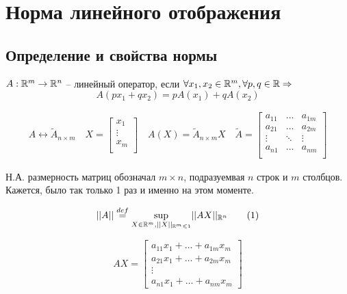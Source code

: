 \documentclass[main]{subfiles}
\begin{document}
\chapter{Норма линейного отображения}
\section{Определение и свойства нормы}
\begin{definition}
    $A: {\mathbb{R}}^m \rightarrow {\mathbb{R}}^n$ -- линейный оператор, если
    $ \forall x_1, x_2 \in {\mathbb{R}}^m, \forall p, q \in {\mathbb{R}} \Rightarrow$
    \[A(px_1 + qx_2) = pA(x_1) + qA(x_2)\]
\end{definition}
\begin{gather*}
    A \leftrightarrow \tilde{A}_{n \times m} \quad
    X =
        \begin{bmatrix}
            x_1 \\
            \vdots \\
            x_m  \\
        \end{bmatrix} \quad 
    A(X) = \tilde{A}_{n \times m} X \quad
    \tilde{A} = 
    \begin{bmatrix}
        a_{11} & \ldots & a_{1m} \\
        a_{21} & \ldots & a_{2m} \\
        \vdots & \ddots & \vdots \\
        a_{n1} & \ldots & a_{nm} \\
    \end{bmatrix}
\end{gather*}

\begin{remark}
    Н.А. размерность матриц обозначал $m \times n$, подразуемвая $n$ строк и $m$ столбцов.
    Кажется, было так только 1 раз и именно на этом моменте.
\end{remark}

\begin{definition}
    \[||A|| \stackrel{def}{=} \underset{X \in {\mathbb{R}}^m, ||X||_{{\mathbb{R}}^m \leqslant 1}}{\sup}
     {||AX||_{{\mathbb{R}}^n}} \tag{1} \]
\end{definition}


\[AX = \begin{bmatrix}
    a_{11}x_1 + \ldots + a_{1m}x_m \\
    a_{21}x_1 + \ldots + a_{2m}x_m \\
    \vdots \\
    a_{n1}x_1 + \ldots + a_{nm}x_m
\end{bmatrix}\]
\end{document}
